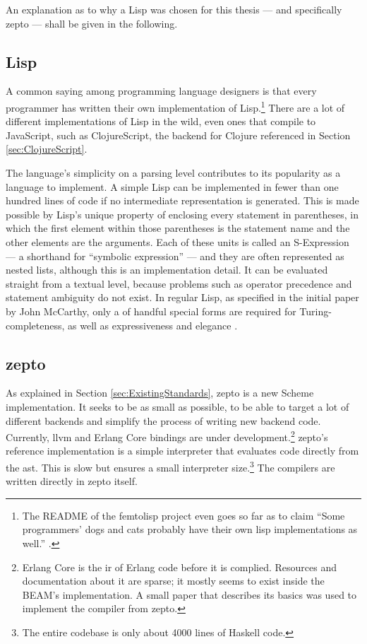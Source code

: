 \documentclass[oneside,11pt,xetex]{scrbook}
\begin{document}
An explanation as to why a Lisp was chosen for this thesis --- and specifically
zepto --- shall be given in the following.

\subsection{Lisp}

A common saying among programming language designers is that every programmer has written
their own implementation of Lisp.\footnote{The README of the femtolisp project even goes so
far as to claim ``Some programmers' dogs and cats probably have their own lisp implementations
as well.'' \parencite{BEZL}.} There are a lot of different implementations of Lisp
in the wild, even ones that compile to JavaScript, such as ClojureScript, the
backend for Clojure referenced in Section \ref{sec:ClojureScript}.

The language's simplicity on a parsing level contributes to its popularity as
a language to implement.
A simple Lisp can be implemented in fewer than one hundred lines of code if no
intermediate representation is generated. This is made possible by Lisp's unique property
of enclosing every statement in parentheses, in which the first element within
those parentheses is the statement name and the other elements are the arguments.
Each of these units is called an S-Expression --- a shorthand for ``symbolic expression'' ---
and they are often represented as nested lists, although this is an implementation detail.
It can be evaluated straight from a textual level, because problems such as operator precedence
and statement ambiguity do not exist. In regular Lisp, as specified in the initial paper by
John McCarthy, only a of handful special forms are required for Turing-completeness, as well
as expressiveness and elegance \parencite{JCM}.

\subsection{zepto}
\label{ququ}

As explained in Section \ref{sec:ExistingStandards}, zepto is a new Scheme implementation. It seeks
to be as small as possible, to be able to target a lot of different backends and simplify the
process of writing new backend code. Currently, \gls{llvm} and Erlang Core bindings are under
development.\footnote{Erlang Core is the \gls{ir} of Erlang code before it is complied. Resources
and documentation about it are sparse; it mostly seems to exist inside the BEAM's implementation.
A small paper \parencite{ERL} that describes its basics was used to implement the compiler
from zepto.} zepto's reference implementation is a simple interpreter
that evaluates code directly from the \gls{ast}. This is slow but ensures a small
interpreter size.\footnote{The entire codebase is only about 4000 lines of Haskell code.}
The compilers are written directly in zepto itself.
\end{document}
